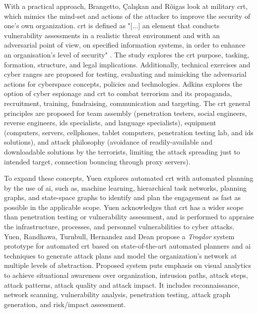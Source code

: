 With a practical approach, Brangetto, \c{C}al\i\c{s}kan and R\~{o}igas \cite{Brangetto2015} look at military \gls{crt}, which mimics the mind-set and actions of the attacker to improve the security of one's own organization. \gls{crt} is defined as "[...] an element that conducts vulnerability assessments in a realistic threat environment and with an adversarial point of view, on specified information systems, in order to enhance an organisation’s level of security" \cite{Brangetto2015}. The study explores the \gls{crt} purpose, tasking, formation, structure, and legal implications. Additionally, technical exercises and cyber ranges are proposed for testing, evaluating and mimicking the adversarial actions for cyberspace concepts, policies and technologies.
Adkins \cite{Adkins2013} explores the option of cyber espionage and \gls{crt} to combat terrorism and its propaganda, recruitment, training, fundraising, communication and targeting. The \gls{crt} general principles are proposed for team assembly (penetration testers, social engineers, reverse engineers, \gls{ids} specialists, and language specialists), equipment (computers, servers, cellphones, tablet computers, penetration testing lab, and \gls{ids} solutions), and attack philosophy (avoidance of readily-available and downloadable solutions by the terrorists, limiting the attack spreading just to intended target, connection bouncing through proxy servers).

To expand these concepts, Yuen \cite{Yuen2015} explores automated \gls{crt} with automated planning by the use of \gls{ai}, such as, machine learning, hierarchical task networks, planning graphs, and state-space graphs to identify and plan the engagement as fast as possible in the applicable scope. Yuen acknowledges that \gls{crt} has a wider scope than penetration testing or vulnerability assessment, and is performed to appraise the infrastructure, processes, and personnel vulnerabilities to cyber attacks. 
Yuen, Randhawa, Turnbull, Hernandez and Dean \cite{Yuen2015-2} \cite{Randhawa2018} propose a \textit{Trogdor} system prototype for automated \gls{crt} based on state-of-the-art automated planners and \gls{ai} techniques to generate attack plans and model the organization's network at multiple levels of abstraction. Proposed system puts emphasis on visual analytics to achieve situational awareness over organization, intrusion paths, attack steps, attack patterns, attack quality and attack impact. It includes reconnaissance, network scanning, vulnerability analysis, penetration testing, attack graph generation, and risk/impact assessment. 